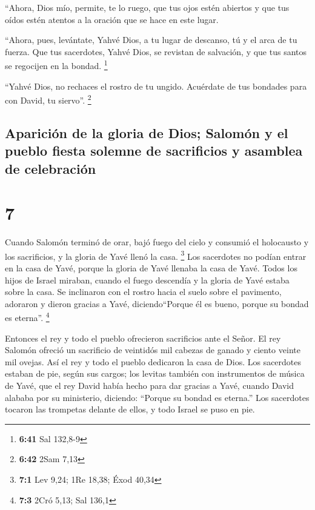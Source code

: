  ``Ahora, Dios mío, permite, te lo ruego, que tus ojos
estén abiertos y que tus oídos estén atentos a la oración que se hace en
este lugar.

 ``Ahora, pues, levántate, Yahvé Dios, a tu lugar de
descanso, tú y el arca de tu fuerza. Que tus sacerdotes, Yahvé Dios, se
revistan de salvación, y que tus santos se regocijen en la bondad.
\footnote{\textbf{6:41} Sal 132,8-9}

 ``Yahvé Dios, no rechaces el rostro de tu ungido.
Acuérdate de tus bondades para con David, tu siervo''. \footnote{\textbf{6:42}
  2Sam 7,13}

\hypertarget{apariciuxf3n-de-la-gloria-de-dios-salomuxf3n-y-el-pueblo-fiesta-solemne-de-sacrificios-y-asamblea-de-celebraciuxf3n}{%
\subsection{Aparición de la gloria de Dios; Salomón y el pueblo fiesta
solemne de sacrificios y asamblea de
celebración}\label{apariciuxf3n-de-la-gloria-de-dios-salomuxf3n-y-el-pueblo-fiesta-solemne-de-sacrificios-y-asamblea-de-celebraciuxf3n}}

\hypertarget{section-6}{%
\section{7}\label{section-6}}

 Cuando Salomón terminó de orar, bajó fuego del cielo y
consumió el holocausto y los sacrificios, y la gloria de Yavé llenó la
casa. \footnote{\textbf{7:1} Lev 9,24; 1Re 18,38; Éxod 40,34}
 Los sacerdotes no podían entrar en la casa de Yavé,
porque la gloria de Yavé llenaba la casa de Yavé.  Todos
los hijos de Israel miraban, cuando el fuego descendía y la gloria de
Yavé estaba sobre la casa. Se inclinaron con el rostro hacia el suelo
sobre el pavimento, adoraron y dieron gracias a Yavé, diciendo``Porque
él es bueno, porque su bondad es eterna''. \footnote{\textbf{7:3} 2Cró
  5,13; Sal 136,1}

 Entonces el rey y todo el pueblo ofrecieron sacrificios
ante el Señor.  El rey Salomón ofreció un sacrificio de
veintidós mil cabezas de ganado y ciento veinte mil ovejas. Así el rey y
todo el pueblo dedicaron la casa de Dios.  Los sacerdotes
estaban de pie, según sus cargos; los levitas también con instrumentos
de música de Yavé, que el rey David había hecho para dar gracias a Yavé,
cuando David alababa por su ministerio, diciendo: ``Porque su bondad es
eterna.'' Los sacerdotes tocaron las trompetas delante de ellos, y todo
Israel se puso en pie.

